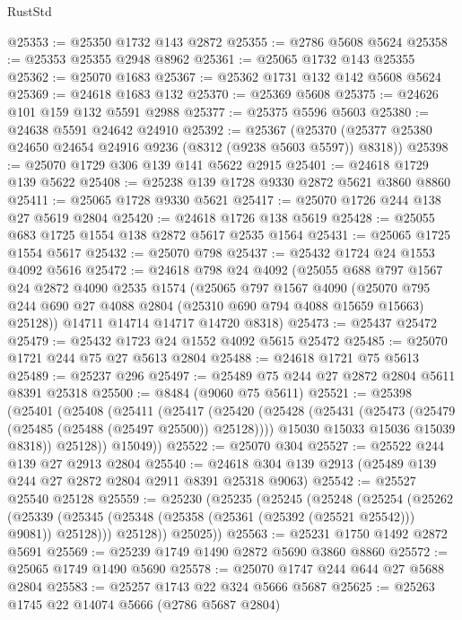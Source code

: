 \begin{lexlean}{RustStd}
\begin{coremodule}
@25353 := @25350 @1732 @143 @2872
@25355 := @2786 @5608 @5624
@25358 := @25353 @25355 @2948 @8962
@25361 := @25065 @1732 @143 @25355
@25362 := @25070 @1683
@25367 := @25362 @1731 @132 @142 @5608 @5624
@25369 := @24618 @1683 @132
@25370 := @25369 @5608
@25375 := @24626 @101 @159 @132 @5591 @2988
@25377 := @25375 @5596 @5603
@25380 := @24638 @5591 @24642 @24910
@25392 := @25367
    (@25370 (@25377 @25380 @24650 @24654 @24916 @9236 (@8312 (@9238 @5603 @5597)) @8318))
@25398 := @25070 @1729 @306 @139 @141 @5622 @2915
@25401 := @24618 @1729 @139 @5622
@25408 := @25238 @139 @1728 @9330 @2872 @5621 @3860 @8860
@25411 := @25065 @1728 @9330 @5621
@25417 := @25070 @1726 @244 @138 @27 @5619 @2804
@25420 := @24618 @1726 @138 @5619
@25428 := @25055 @683 @1725 @1554 @138 @2872 @5617 @2535 @1564
@25431 := @25065 @1725 @1554 @5617
@25432 := @25070 @798
@25437 := @25432 @1724 @24 @1553 @4092 @5616
@25472 := @24618
    @798
    @24
    @4092
    (@25055
      @688
      @797
      @1567
      @24
      @2872
      @4090
      @2535
      @1574
      (@25065
        @797
        @1567
        @4090
        (@25070 @795 @244 @690 @27 @4088 @2804 (@25310 @690 @794 @4088 @15659 @15663) @25128))
      @14711
      @14714
      @14717
      @14720
      @8318)
@25473 := @25437 @25472
@25479 := @25432 @1723 @24 @1552 @4092 @5615 @25472
@25485 := @25070 @1721 @244 @75 @27 @5613 @2804
@25488 := @24618 @1721 @75 @5613
@25489 := @25237 @296
@25497 := @25489 @75 @244 @27 @2872 @2804 @5611 @8391 @25318
@25500 := @8484 (@9060 @75 @5611)
@25521 := @25398
    (@25401
      (@25408
        (@25411
          (@25417
            (@25420
              (@25428
                (@25431 (@25473 (@25479 (@25485 (@25488 (@25497 @25500)) @25128))))
                @15030
                @15033
                @15036
                @15039
                @8318))
            @25128))
        @15049))
@25522 := @25070 @304
@25527 := @25522 @244 @139 @27 @2913 @2804
@25540 := @24618 @304 @139 @2913 (@25489 @139 @244 @27 @2872 @2804 @2911 @8391 @25318 @9063)
@25542 := @25527 @25540 @25128
@25559 := @25230
    (@25235
      (@25245
        (@25248
          (@25254
            (@25262
              (@25339 (@25345 (@25348 (@25358 (@25361 (@25392 (@25521 @25542))) @9081)) @25128)))
            @25128))
        @25025))
@25563 := @25231 @1750 @1492 @2872 @5691
@25569 := @25239 @1749 @1490 @2872 @5690 @3860 @8860
@25572 := @25065 @1749 @1490 @5690
@25578 := @25070 @1747 @244 @644 @27 @5688 @2804
@25583 := @25257 @1743 @22 @324 @5666 @5687
@25625 := @25263
    @1745
    @22
    @14074
    @5666
    (@2786 @5687 @2804)

\end{coremodule}
\end{lexlean}
